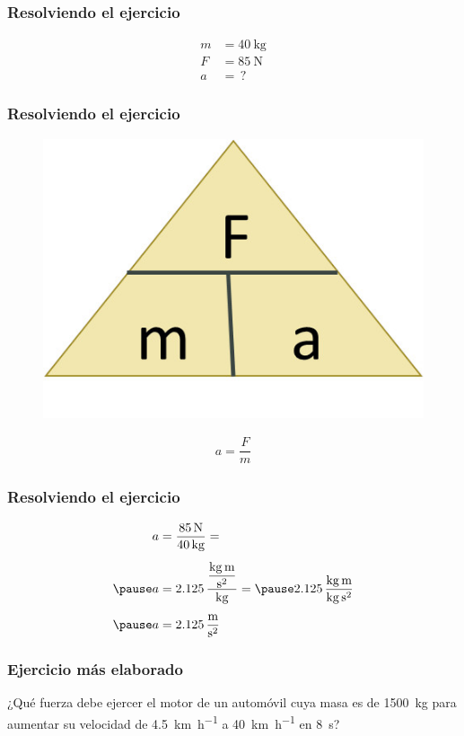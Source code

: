 \documentclass[14pt]{beamer}
\begin{document}
\begin{frame}
\frametitle{Resolviendo el ejercicio}
\pause
\begin{align*}
m &= \SI{40}{\kilo\gram} \\[0.5em]
F &= \SI{85}{\newton} \\[0.5em]
a &= \, ?
\end{align*}
\end{frame}
\begin{frame}
\frametitle{Resolviendo el ejercicio}
\pause
\begin{figure}
    \centering
    \includegraphics[scale=1]{Imagenes/Newton_11.jpg}
\end{figure}
\pause
\begin{align*}
a = \dfrac{F}{m}
\end{align*}
\end{frame}
\begin{frame}
\frametitle{Resolviendo el ejercicio}
\pause
\begin{eqnarray*}
\begin{aligned}
a &= \dfrac{\SI{85}{\newton}}{\SI{40}{\kilo\gram}} = \\[0.5em] \pause
a &= 2.125 \, \dfrac{\dfrac{\si{\kilo\gram\meter}}{\si{\square\second}}}{\si{\kilo\gram}} = \pause 2.125 \, \dfrac{\si{\kilo\gram\meter}}{\si{\kilo\gram\square\second}} \\[0.5em] \pause
a &= \SI[per-mode=fraction]{2.125}{\meter\per\square\second}
\end{aligned}
\end{eqnarray*}
\end{frame}
\begin{frame}
\frametitle{Ejercicio más elaborado}
¿Qué fuerza debe ejercer el motor de un automóvil cuya masa es de \SI{1500}{\kilo\gram} para aumentar su velocidad de \SI{4.5}{\kilo\meter\per\hour} a \SI{40}{\kilo\meter\per\hour} en \SI{8}{\second}?
\end{frame}
\end{document}

